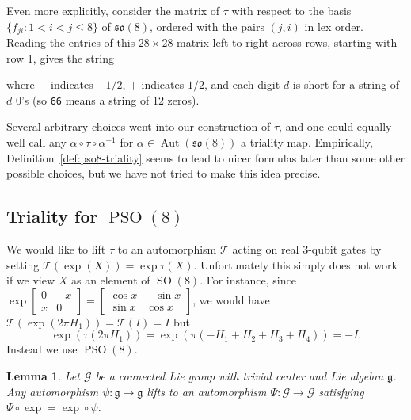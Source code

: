 \documentclass[reqno]{amsart}
\newtheorem{lemma}[theorem]{Lemma}
\theoremstyle{definition} \newtheorem{example}[theorem]{Example}
\newcommand{\SO}{\operatorname{SO}}
\newcommand{\PSO}{\operatorname{PSO}}
\newcommand{\so}{\mathfrak{so}}
\DeclareMathOperator{\Aut}{Aut}
\newcommand{\G}{\mathcal{G}}
\newcommand{\g}{\mathfrak{g}}
\newcommand{\T}{\mathcal{T}}
\begin{document}
Even more explicitly,  consider the matrix of $\tau$ with respect to the basis $\{f_{ji} : 1 < i < j \leq 8\}$ of $\so(8)$, ordered with the pairs $(j,i)$ in lex order. Reading the entries of this $28 \times 28$ matrix left to right across rows, starting with row 1, gives the string 
\begin{center}
\texttt{}
\end{center}
where $-$ indicates $-1/2$, $+$ indicates $1/2$, and each digit $d$ is short for a string of $d$ $0$'s (so \texttt{66} means a string of 12 zeros).

Several arbitrary choices went into our construction of $\tau$, and one could equally well call any $\alpha \circ \tau \circ \alpha^{-1}$ for $\alpha \in \Aut(\so(8))$ a triality map. Empirically, Definition~\ref{def:pso8-triality} seems to lead to nicer formulas later than some other possible choices, but we have not tried to make this idea precise.

\subsection{Triality for $\PSO(8)$} \label{subsec:pso8-triality}
We would like to lift $\tau$ to an automorphism $\T$ acting on real 3-qubit gates by setting $\T(\exp(X)) = \exp \tau(X)$. Unfortunately this simply does not work if we view $X$ as an element of $\SO(8)$. For instance,  since $\exp \left[ \begin{smallmatrix} 0 & -x \\ x & 0 \end{smallmatrix} \right] = \left[ \begin{smallmatrix} \cos x & -\sin x \\ \sin x & \cos x \end{smallmatrix} \right]$, we would have $\T(\exp(2\pi H_1)) = \T(I) = I$ but 
\begin{equation*}
\exp(\tau(2\pi H_1)) = \exp(\pi(-H_1+H_2+H_3+H_4)) = -I.
\end{equation*}
Instead we use $\PSO(8)$.

\begin{lemma} \label{lem:adjoint-aut} Let $\G$ be a connected Lie group with trivial center and Lie algebra $\g$. Any automorphism $\psi : \g \to \g$ lifts to an automorphism $\Psi : \G \to \G$ satisfying $\Psi \circ \exp = \exp \circ \psi$.
\end{lemma}
\end{document}
